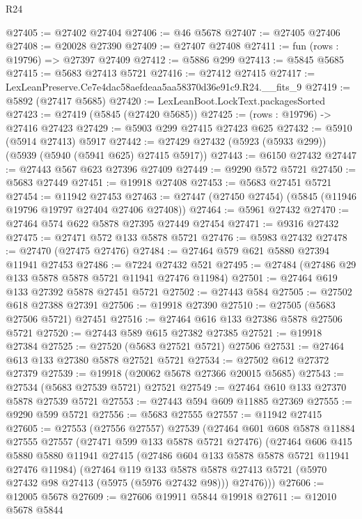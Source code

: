 \begin{lexlean}{R24}
\begin{coremodule}
@27405 := @27402 @27404
@27406 := @46 @5678
@27407 := @27405 @27406
@27408 := @20028 @27390
@27409 := @27407 @27408
@27411 := fun (rows : @19796) => @27397 @27409
@27412 := @5886 @299
@27413 := @5845 @5685
@27415 := @5683 @27413 @5721
@27416 := @27412 @27415
@27417 := LexLeanPreserve.Ce7e4dac58aefdeaa5aa58370d36e91c9.R24.__fits_9
@27419 := @5892 (@27417 @5685)
@27420 := LexLeanBoot.LockText.packagesSorted
@27423 := @27419 (@5845 (@27420 @5685))
@27425 := (rows : @19796) -> @27416 @27423
@27429 := @5903 @299 @27415 @27423 @625
@27432 := @5910 (@5914 @27413) @5917
@27442 := @27429 @27432 (@5923 (@5933 @299)) (@5939 (@5940 (@5941 @625) @27415 @5917))
@27443 := @6150 @27432
@27447 := @27443 @567 @623 @27396 @27409
@27449 := @9290 @572 @5721
@27450 := @5683 @27449
@27451 := @19918 @27408
@27453 := @5683 @27451 @5721
@27454 := @11942 @27453
@27463 := @27447 (@27450 @27454) (@5845 (@11946 @19796 @19797 @27404 @27406 @27408))
@27464 := @5961 @27432
@27470 := @27464 @574 @622 @5878 @27395 @27449 @27454
@27471 := @9316 @27432
@27475 := @27471 @572 @133 @5878 @5721
@27476 := @5983 @27432
@27478 := @27470 (@27475 @27476)
@27484 := @27464 @579 @621 @5880 @27394 @11941 @27453
@27486 := @7224 @27432 @521
@27495 := @27484 (@27486 @29 @133 @5878 @5878 @5721 @11941 @27476 @11984)
@27501 := @27464 @619 @133 @27392 @5878 @27451 @5721
@27502 := @27443 @584
@27505 := @27502 @618 @27388 @27391
@27506 := @19918 @27390
@27510 := @27505 (@5683 @27506 @5721) @27451
@27516 := @27464 @616 @133 @27386 @5878 @27506 @5721
@27520 := @27443 @589 @615 @27382 @27385
@27521 := @19918 @27384
@27525 := @27520 (@5683 @27521 @5721) @27506
@27531 := @27464 @613 @133 @27380 @5878 @27521 @5721
@27534 := @27502 @612 @27372 @27379
@27539 := @19918 (@20062 @5678 @27366 @20015 @5685)
@27543 := @27534 (@5683 @27539 @5721) @27521
@27549 := @27464 @610 @133 @27370 @5878 @27539 @5721
@27553 := @27443 @594 @609 @11885 @27369
@27555 := @9290 @599 @5721
@27556 := @5683 @27555
@27557 := @11942 @27415
@27605 := @27553
    (@27556 @27557)
    @27539
    (@27464
      @601
      @608
      @5878
      @11884
      @27555
      @27557
      (@27471 @599 @133 @5878 @5721 @27476)
      (@27464
        @606
        @415
        @5880
        @5880
        @11941
        @27415
        (@27486 @604 @133 @5878 @5878 @5721 @11941 @27476 @11984)
        (@27464
          @119
          @133
          @5878
          @5878
          @27413
          @5721
          (@5970 @27432 @98 @27413 (@5975 (@5976 @27432 @98)))
          @27476)))
@27606 := @12005 @5678
@27609 := @27606 @19911 @5844 @19918
@27611 := @12010 @5678 @5844

\end{coremodule}
\end{lexlean}
